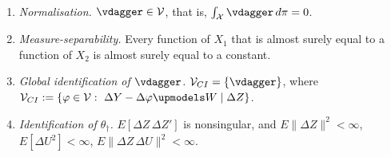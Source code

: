 %

\begin{assumption}[A1b: Identification]\label{ass:ident}~
\begin{enumerate}
\item[(i)] \emph{Normalisation.} $\vdagger\in\mathcal V$, that is, $\int_{\mathcal X}\vdagger\,d\pi=0$.
\item[(ii)] \emph{Measure-separability.} Every function of $X_1$ that is almost surely equal to a
function of $X_2$ is almost surely equal to a constant.
\item[(iii)] \emph{Global identification of $\vdagger$.} $\mathcal V_{CI}=\{\vdagger\}$, where
$\mathcal V_{CI}:=\{\varphi\in\mathcal V:\ \Delta Y-\Delta\varphi\upmodels W\mid\Delta Z\}$.
\item[(iv)] \emph{Identification of $\theta_\dagger$.} $E[\Delta Z\,\Delta Z']$ is nonsingular, and
$E\|\Delta Z\|^{2}<\infty$, $E[\Delta U^{2}]<\infty$, $E\|\Delta Z\,\Delta U\|^{2}<\infty$.
\end{enumerate}
\end{assumption}

